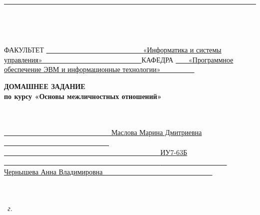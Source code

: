 \begin{titlepage}
    \noindent
	\rule{17cm}{3pt}
    \\
    \begin{spacing}{0.1}
        ~\\
    \end{spacing}
	\noindent ФАКУЛЬТЕТ
    \uline
    {
            ~~~~~~~~~~~~~~~~~~~~~~~~~~~
            «Информатика и системы управления»
            ~~~~~~~~~~~~~~~~~~~~~~~~~~~
    }
    \newline\newline
	\noindent КАФЕДРА
    \uline{
            ~~~
            «Программное обеспечение ЭВМ и информационные технологии»
            ~~~~~~~~~
        }
    \newline\newline
    \newline\newline
    \newline\newline
    \newline\newline
    \newline

    \fontsize{18pt}{18pt}\selectfont
	\begin{center}
        \textbf{ДОМАШНЕЕ ЗАДАНИЕ}\\
        \textbf{по курсу «Основы межличностных отношений»}\\
        ~\\
        \fontsize{16pt}{16pt}\selectfont
	\end{center}
    ~\\

	\fontsize{14pt}{14pt}\selectfont
	\noindent{}
    \uline{
        ~~~~~~~~~~~~~~~~~~~~~~~~~~~~~~
        Маслова Марина Дмитриевна
        ~~~~~~~~~~~~~~~~~~~~~~~~~~~~~~
    }
    \newline\newline
	\noindent{}
    \uline{
        ~~~~~~~~~~~~~~~~~~~~~~~~~~~~~~~~~~~~~~~~~~~~
        ИУ7-63Б
        ~~~~~~~~~~~~~~~~~~~~~~~~~~~~~~~~~~~~~~~~~~~~
    }
    \newline\newline
	\noindent{}
    \uline{
        ~~~~~~~~~~~~~~~~~~~
        Чернышева Анна Владимировна
        ~~~~~~~~~~~~~~~~~~~~~~~~~~~~~~
    }
    \newline\newline
    \newline\newline
    ~\\
    ~\\
    ~\\
    \vspace{17mm}

	\begin{center}
        \textit{\the\year~г.}
	\end{center}

    \restoregeometry
\end{titlepage}
